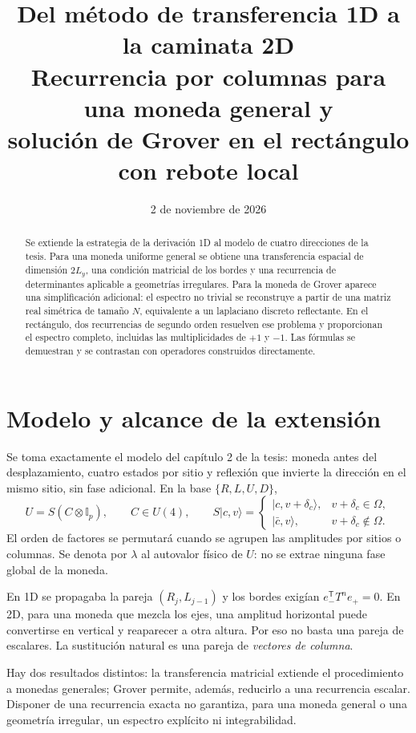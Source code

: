 \documentclass[11pt,a4paper]{article}
\title{Del método de transferencia 1D a la caminata 2D\\[0.3em]
\large Recurrencia por columnas para una moneda general y\\solución de Grover en el rectángulo con rebote local}
\author{}\date{2 de noviembre de 2026}
\newcommand{\ket}[1]{\lvert #1\rangle}
\newcommand{\Id}{\mathbb I}
\numberwithin{equation}{section}
\begin{document}
\maketitle
\begin{abstract}
Se extiende la estrategia de la derivación 1D al modelo de cuatro direcciones de la tesis. Para una moneda uniforme general se obtiene una transferencia espacial de dimensión $2L_y$, una condición matricial de los bordes y una recurrencia de determinantes aplicable a geometrías irregulares. Para la moneda de Grover aparece una simplificación adicional: el espectro no trivial se reconstruye a partir de una matriz real simétrica de tamaño $N$, equivalente a un laplaciano discreto reflectante. En el rectángulo, dos recurrencias de segundo orden resuelven ese problema y proporcionan el espectro completo, incluidas las multiplicidades de $+1$ y $-1$. Las fórmulas se demuestran y se contrastan con operadores construidos directamente.
\end{abstract}

\section{Modelo y alcance de la extensión}
Se toma exactamente el modelo del capítulo 2 de la tesis: moneda antes del desplazamiento, cuatro estados por sitio y reflexión que invierte la dirección en el mismo sitio, sin fase adicional. En la base $\{R,L,U,D\}$,
\begin{equation}
 U=S(C\otimes\Id_p),\qquad C\in U(4),\qquad
 S\ket{c,v}=\begin{cases}
 \ket{c,v+\delta_c},&v+\delta_c\in\Omega,\\
 \ket{\bar c,v},&v+\delta_c\notin\Omega.
 \end{cases}
\end{equation}
El orden de factores se permutará cuando se agrupen las amplitudes por sitios o columnas. Se denota por $\lambda$ al autovalor físico de $U$: no se extrae ninguna fase global de la moneda.

En 1D se propagaba la pareja $(R_j,L_{j-1})$ y los bordes exigían $e_-^{\mathsf T}T^n e_+=0$. En 2D, para una moneda que mezcla los ejes, una amplitud horizontal puede convertirse en vertical y reaparecer a otra altura. Por eso no basta una pareja de escalares. La sustitución natural es una pareja de \emph{vectores de columna}.

Hay dos resultados distintos: la transferencia matricial extiende el procedimiento a monedas generales; Grover permite, además, reducirlo a una recurrencia escalar. Disponer de una recurrencia exacta no garantiza, para una moneda general o una geometría irregular, un espectro explícito ni integrabilidad.
\end{document}
